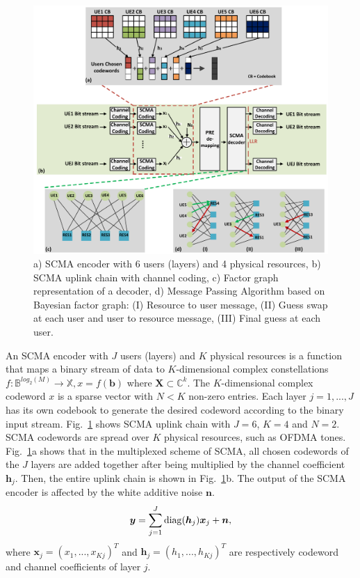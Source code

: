\begin{figure}
  \centering
  \includegraphics[width=0.70\linewidth]{scma/codec/codec}
  \caption{a) SCMA encoder with 6 users (layers) and 4 physical resources,
           b) SCMA uplink chain with channel coding,
           c) Factor graph representation of a decoder,
           d) Message Passing Algorithm based on Bayesian factor graph:
              (I)   Resource to user message,
              (II)  Guess swap at each user and user to resource message,
              (III) Final guess at each user.}
  \label{fig:scma_codec}
\end{figure}

An SCMA encoder with $J$ users (layers) and $K$ physical resources is a function
that maps a binary stream of data to $K$-dimensional complex constellations
$f : \mathbb{B}^{log_{2}(M)} \rightarrow \mathbb{X}, x = f(\bm{b})$ where
$\bm{X} \subset \mathbb{C}^k$. The $K$-dimensional complex codeword $x$ is a
sparse vector with $N < K$ non-zero entries. Each layer $j=1, ..., J$ has its
own codebook to generate the desired codeword according to the binary input
stream. Fig.~\ref{fig:scma_codec} shows SCMA uplink chain with $J = 6$, $K = 4$
and $N = 2$. SCMA codewords are spread over $K$ physical resources, such as
OFDMA tones. Fig.~\ref{fig:scma_codec}a shows that in the multiplexed scheme of
SCMA, all chosen codewords of the $J$ layers are added together after being
multiplied by the channel coefficient $\bm{h}_j$. Then, the entire uplink chain
is shown in Fig.~\ref{fig:scma_codec}b. The output of the SCMA encoder is
affected by the white additive noise $\bm{n}$.
\begin{equation}
  \label{eq:scma_1}
  \bm{y} = \sum\limits_{j=1}^J \operatorname{diag}(\bm{h}_j)\bm{x}_j+\bm{n},
\end{equation}
where $\bm{x}_j=(x_1,...,x_{Kj})^T$ and $\bm{h}_j=(h_1,...,h_{Kj})^T$ are
respectively codeword and channel coefficients of layer $j$.

